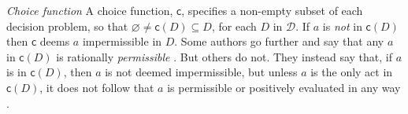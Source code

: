 \documentclass[a4paper,final]{article}
\newcommand{\D}{\mathcal{D}}
\renewcommand\c{\mathsf{c}} %
\renewcommand{\emptyset}{\varnothing}
\newenvironment{CCM rewritten}
{\begingroup\color{blue}} %
{\endgroup}              %
\begin{document}
{
\emph{Choice function } A choice function, $\c$, specifies a non-empty subset of each decision problem, so that $\emptyset \neq \c(D) \subseteq D$, for each $D$ in $\D$. If $a$ is \emph{not} in $\c(D)$ then $\c$ deems $a$ impermissible in $D$. Some authors go further and say that any $a$ in $\c(D)$ is rationally \emph{permissible} \citep[e.g.,][]{moss2015tse}. But others do not. They instead say that, if $a$ is in $\c(D)$, then $a$ is not deemed impermissible, but unless $a$ is the only act in $\c(D)$, it does not follow that $a$ is permissible or positively evaluated in any way \citep[e.g.,][]{debock2019iar}.}











\end{document}
